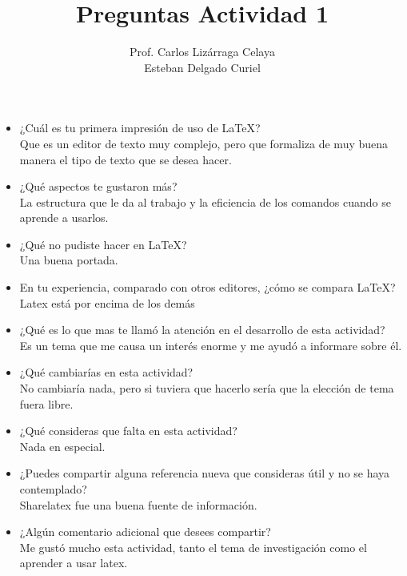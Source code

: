 \documentclass{article}
\title{\Huge Preguntas Actividad 1}
\author{Prof. Carlos Lizárraga Celaya\vspace{0.5cm}\\
Esteban Delgado Curiel}
\begin{document}
\maketitle
\begin{itemize}
\item ¿Cuál es tu primera impresión de uso de LaTeX?\\
Que es un editor de texto muy complejo, pero que formaliza de muy buena manera el tipo de texto que se desea hacer.
\item ¿Qué aspectos te gustaron más?\\
La estructura que le da al trabajo y la eficiencia de los comandos cuando se aprende a usarlos.
\item ¿Qué no pudiste hacer en LaTeX?\\
Una buena portada.
\item En tu experiencia, comparado con otros editores, ¿cómo se compara LaTeX?\\ 
Latex está por encima de los demás
\item ¿Qué es lo que mas te llamó la atención en el desarrollo de esta actividad?\\
Es un tema que me causa un interés enorme y me ayudó a informare sobre él.
\item ¿Qué cambiarías en esta actividad?\\ No cambiaría nada, pero si tuviera que hacerlo sería que la elección de tema fuera libre.
\item ¿Qué consideras que falta en esta actividad?\\ 
Nada en especial.
\item ¿Puedes compartir alguna referencia nueva que consideras útil y no se haya contemplado?\\
Sharelatex fue una buena fuente de información.
\item ¿Algún comentario adicional que desees compartir? \\
Me gustó mucho esta actividad, tanto el tema de investigación como el aprender a usar latex.
\end{itemize}
\end{document}
